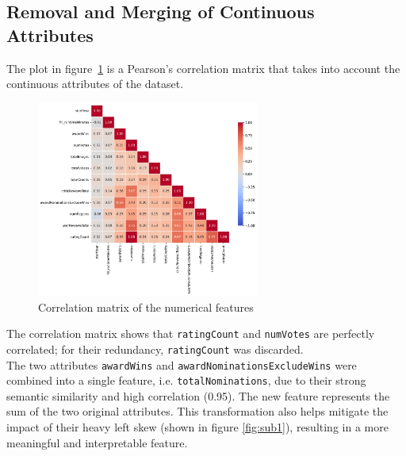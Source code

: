 \subsection{Removal and Merging of Continuous Attributes}\label{sec:var_elim_creation}

The plot in figure~\ref{fig:correlation_matrix} is a Pearson's correlation matrix that takes into
account the continuous attributes of the dataset.\\

\begin{figure}[H]
    \centering
    \includegraphics[width=0.65\textwidth]{plots/correlation_matrix.png}
    \caption{Correlation matrix of the numerical features}
    \label{fig:correlation_matrix}
\end{figure}


The correlation matrix shows that \texttt{ratingCount} and \texttt{numVotes} are perfectly correlated;
for their redundancy, \texttt{ratingCount} was discarded.\\

The two attributes \texttt{awardWins} and \texttt{awardNominationsExcludeWins} were combined into a single
feature, i.e. \texttt{totalNominations}, due to their strong semantic similarity and high correlation (0.95).
The new feature represents the sum of the two original attributes. This transformation also helps
mitigate the impact of their heavy left skew (shown in figure \ref{fig:sub1}), resulting in a more meaningful and interpretable feature.\\

